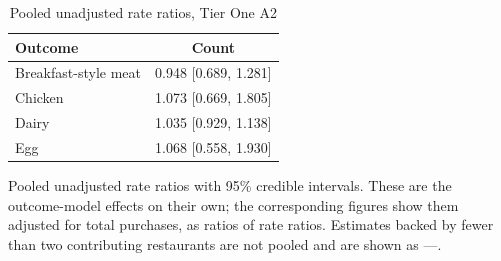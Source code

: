 \begin{table}[H]
\centering
\caption{Pooled unadjusted rate ratios, Tier One A2}
\label{tab:rr_t1_a2}
\begin{tabular}{lc}
\toprule
Outcome & Count \\
\midrule
Breakfast-style meat & 0.948 [0.689, 1.281] \\
Chicken & 1.073 [0.669, 1.805] \\
Dairy & 1.035 [0.929, 1.138] \\
Egg & 1.068 [0.558, 1.930] \\
\bottomrule
\end{tabular}
\par\smallskip\footnotesize Pooled unadjusted rate ratios with 95\% credible intervals. These are the outcome-model effects on their own; the corresponding figures show them adjusted for total purchases, as ratios of rate ratios. Estimates backed by fewer than two contributing restaurants are not pooled and are shown as ---.
\end{table}
